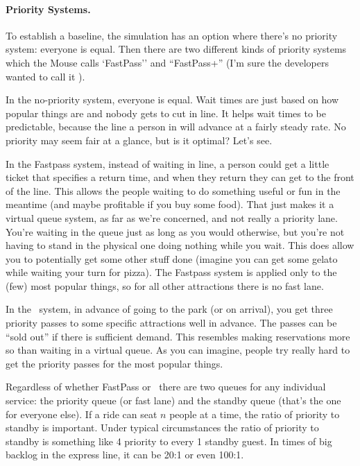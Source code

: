 \paragraph{Priority Systems.}
To establish a baseline, the simulation has an option where there's no priority system: everyone is equal. Then there are two different kinds of priority systems which the Mouse calls `FastPass'' and ``FastPass+'' (I'm sure the developers wanted to call it \FPP).

In the no-priority system, everyone is equal. Wait times are just based on how popular things are and nobody gets to cut in line. It helps wait times to be predictable, because the line a person in will advance at a fairly steady rate. No priority may seem fair at a glance, but is it optimal? Let's see. 

In the Fastpass system, instead of waiting in line, a person could get a little ticket that specifies a return time, and when they return they can get to the front of the line. This allows the people waiting to do something useful or fun in the meantime (and maybe profitable if you buy some food). That just makes it a virtual queue system, as far as we're concerned, and not really a priority lane. You're waiting in the queue just as long as you would otherwise, but you're not having to stand in the physical one doing nothing while you wait. This does allow you to potentially get some other stuff done (imagine you can get some gelato while waiting your turn for pizza). The Fastpass system is applied only to the (few) most popular things, so for all other attractions there is no fast lane. 

In the \FPP~system, in advance of going to the park (or on arrival), you get three priority passes to some specific attractions well in advance. The passes can be ``sold out'' if there is sufficient demand. This resembles making reservations more so than waiting in a virtual queue. As you can imagine, people try really hard to get the priority passes for the most popular things.

Regardless of whether FastPass or \FPP~there are two queues for any individual service: the priority queue (or fast lane) and the standby queue (that's the one for everyone else). If a ride can seat $n$ people at a time, the ratio of priority to standby is important. Under typical circumstances the ratio of priority to standby is something like 4 priority to every 1 standby guest. In times of big backlog in the express line, it can be 20:1 or even 100:1.

